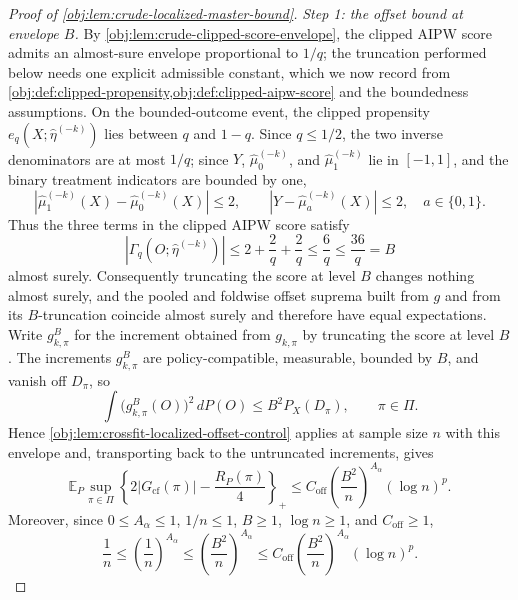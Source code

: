 \begin{proof}[Proof of \cref{obj:lem:crude-localized-master-bound}]
\emph{Step 1: the offset bound at envelope \(B\).}  By \cref{obj:lem:crude-clipped-score-envelope}, the clipped AIPW score admits an almost-sure envelope proportional to \(1/q\); the truncation performed below needs one explicit admissible constant, which we now record from \cref{obj:def:clipped-propensity,obj:def:clipped-aipw-score} and the boundedness assumptions.  On the bounded-outcome event, the clipped propensity \(e_q(X;\widehat\eta^{(-k)})\) lies between \(q\) and \(1-q\).  Since \(q\le1/2\), the two inverse denominators are at most \(1/q\); since \(Y\), \(\widehat\mu_0^{(-k)}\), and \(\widehat\mu_1^{(-k)}\) lie in \([-1,1]\), and the binary treatment indicators are bounded by one,
\[
\left|\widehat\mu_1^{(-k)}(X)-\widehat\mu_0^{(-k)}(X)\right|\le2,
\qquad
\left|Y-\widehat\mu_a^{(-k)}(X)\right|\le2,
\quad a\in\{0,1\}.
\]
Thus the three terms in the clipped AIPW score satisfy
\[
\left|\Gamma_q\!\left(O;\widehat\eta^{(-k)}\right)\right|
\le 2+\frac2q+\frac2q
\le \frac6q
\le \frac{36}{q}=B
\]
almost surely.  Consequently truncating the score at level \(B\) changes nothing almost surely, and the pooled and foldwise offset suprema built from \(g\) and from its \(B\)-truncation coincide almost surely and therefore have equal expectations. %
Write \(g^B_{k,\pi}\) for the increment obtained from \(g_{k,\pi}\) by truncating the score at level \(B\).  The increments \(g^B_{k,\pi}\) are policy-compatible, measurable, bounded by \(B\), and vanish off \(D_\pi\), so
\[
\int \bigl(g^B_{k,\pi}(O)\bigr)^2\,dP(O)\le B^2P_X(D_\pi),
\qquad \pi\in\Pi .
\]
Hence \cref{obj:lem:crossfit-localized-offset-control} applies at sample size \(n\) with this envelope and, transporting back to the untruncated increments, gives
\[
\mathbb E_P\sup_{\pi\in\Pi}\left\{2|G_{\mathrm{cf}}(\pi)|-\frac{R_P(\pi)}4\right\}_+
\le
C_{\mathrm{off}}\left(\frac{B^2}{n}\right)^{A_\alpha}(\log n)^p .
\]
Moreover, since \(0\le A_\alpha\le1\), \(1/n\le1\), \(B\ge1\), \(\log n\ge1\), and \(C_{\mathrm{off}}\ge1\),
\[
\frac1n\le\left(\frac1n\right)^{A_\alpha}\le\left(\frac{B^2}{n}\right)^{A_\alpha}
\le C_{\mathrm{off}}\left(\frac{B^2}{n}\right)^{A_\alpha}(\log n)^p .
\]


\end{proof}
